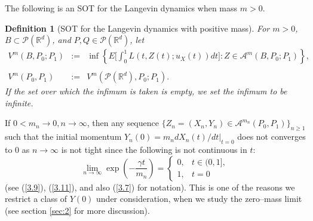 \documentclass[12pt]{article}
\newtheorem{definition}{Definition}[section]
\begin{document}
The following is an SOT for the Langevin dynamics when mass $m>0$.
\begin{definition}[SOT for the Langevin dynamics with positive mass\label{def1}]
For $m>0$, $B\subset \mathcal{P}(\mathbb{R}^d)$, and $P,Q\in \mathcal{P}(\mathbb{R}^d)$, let
\begin{eqnarray}
V^m(B, P_0;P_1)
&:=&\inf \left\{E\biggl[\int_0^1 L(t,Z(t);u_X (t))dt \biggr]:Z\in \mathcal{A}^m(B,P_0;P_1)\right\},\nonumber\\
\label{1.3}\\
V^m(P_0,P_1)&:=&V^m(\mathcal{P}(\mathbb{R}^d), P_0;P_1).\nonumber
\end{eqnarray}
If the set over which the infimum is taken is empty, we set the infimum to be infinite.
\end{definition}
 
 
If $0<m_n\to 0, n\to\infty$, then any sequence $\{Z_n=(X_n, Y_n)\in \mathcal{A}^{m_n}(P_0,P_1)\}_{n\ge 1}$
such that the initial momentum $Y_n(0)=m_n dX_n(t)/dt|_{t=0}$ does not converges to $0$ as $n\to\infty$ is not tight since
the following is not continuous in $t$:
\begin{equation}\label{1.14}
\lim_{n\to \infty}\exp\left(-\frac{\gamma t}{m_n}\right)
=
\begin{cases}
0,&t\in (0,1],\\
1, &t=0
\end{cases}
\end{equation}
(see (\ref{3.9}), (\ref{3.11}), and also (\ref{3.7}) for notation).
This is one of the reasons  we restrict a class of $Y(0)$ under consideration, when we study the zero--mass limit (see section \ref{sec:2} for more discussion).
\end{document}
